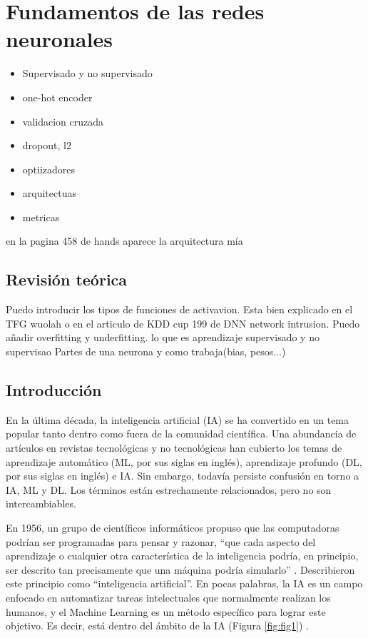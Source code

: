 \chapter{Fundamentos de las redes neuronales} \label{Capitulo_2}
\begin{itemize}
	\item Supervisado y no supervisado
	\item one-hot encoder
	\item validacion cruzada
	\item dropout, l2
	\item optiizadores
	\item arquitectuas
	\item metricas
\end{itemize}
en la pagina 458 de hands aparece la arquitectura mía


\section{Revisión teórica} \label{Subsec: 3_1}
Puedo introducir los tipos de funciones de activavion. Esta bien explicado en el TFG wuolah o en el articulo de KDD cup 199 de DNN network intrusion.
Puedo añadir overfitting y underfitting.
lo que es aprendizaje supervisado y no supervisao
Partes de una neurona y como trabaja(bias, pesos...)



\section{Introducción}

En la última década, la inteligencia artificial (IA) se ha convertido en un tema popular tanto dentro como fuera de la comunidad científica. Una abundancia de artículos en revistas tecnológicas y no tecnológicas han cubierto los temas de aprendizaje automático (ML, por sus siglas en inglés), aprendizaje profundo (DL, por sus siglas en inglés) e IA. Sin embargo, todavía persiste confusión en torno a IA, ML y DL. Los términos están estrechamente relacionados, pero no son intercambiables. 

En 1956, un grupo de científicos informáticos propuso que las computadoras podrían ser programadas para pensar y razonar, ``que cada aspecto del aprendizaje o cualquier otra característica de la inteligencia podría, en principio, ser descrito tan precisamente que una máquina podría simularlo'' \citep{moor2006dartmouth}. Describieron este principio como ``inteligencia artificial''. En pocas palabras, la IA es un campo enfocado en automatizar tareas intelectuales que normalmente realizan los humanos, y el Machine Learning es un método específico para lograr este objetivo. Es decir, está dentro del ámbito de la IA (Figura \ref{fig:fig1}) \citep{choi2020introduction}. 

